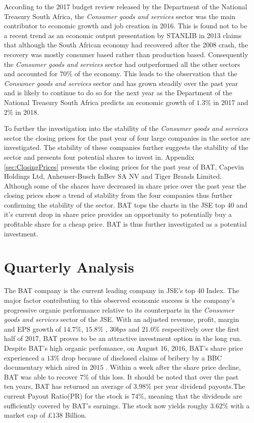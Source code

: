 \documentclass[letterpaper, 10 pt, conference]{ieeeconf}  %
\begin{document}
According to the 2017 budget review \cite{budgetReview} released by the Department of the National Treasury South Africa, the \textit{Consumer goods and services} sector was the main contributor to economic growth and job creation in 2016. This is found not to be a recent trend as an economic output presentation by STANLIB in 2013 \cite{stanlibReport} claims that although the South African economy had recovered after the 2008 crash, the recovery was mostly consumer based rather than production based. Consequently the \textit{Consumer goods and services} sector had outperformed all the other sectors and accounted for $70\%$ of the economy. This leads to the observation that the \textit{Consumer goods and services} sector and has grown steadily over the past year and is likely to continue to do so for the next year as the Department of the National Treasury South Africa predicts an economic growth of $1.3\%$ in 2017 and $2\%$ in 2018.

To further the investigation into the stability of the \textit{Consumer goods and services} sector the closing prices for the past year of four large companies in the sector are investigated. The stability of these companies further suggests the stability of the sector and presents four potential shares to invest in. Appendix \ref{sec:ClosingPrices} presents the closing prices for  the past year of BAT,  Capevin Holdings Ltd, Anheuser-Busch InBev SA NV and Tiger Brands Limited. Although some of the shares have decreased in share price over the past year the closing prices show a trend of stability from the four companies thus further confirming the stability of the sector. BAT tops the charts in the JSE top 40 \cite{top40} and it's current drop in share price provides an opportunity to potentially buy a profitable share for a cheap price. BAT is thus further investigated as a potential investment.
 
 
 \section{ Quarterly Analysis}	
 	The BAT company is the current leading company in JSE's top 40 Index. The major factor contributing to this observed economic success is the company's progressive organic performance relative to its counterparts in the \textit{Consumer goods and services} sector of the JSE.  With  an adjusted revenue, profit, margin and EPS growth of $14.7\%$, $15.8\%$ , $30 bps$ and $21.0\%$ respecitively over the first half of $2017$, BAT proves to be an attractive investment option in the long run\cite{interimResults}. Despite BAT's high organic perfomance, on August $16$, $2016$, BAT's share price experienced a $13\%$ drop because of disclosed claims of bribery by a BBC documentary which aired in $2015$ \cite{Jonathan_Weber}. Within a week after the share price decline,  BAT was able to recover $7\%$ of this loss\cite{interimResults}.  
 	It should be noted that over the past ten years, BAT has returned an average of $3.98\%$ per year dividend payouts.The current Payout Ratio(PR) for the stock is $74\%$, meaning that the dividends are sufficiently covered by BAT's earnings. The stock now yields roughy $3.62\%$ with a market cap of \pounds $138$ Billion\cite{BAT_partOfYourPort}. 
 	
\end{document}
